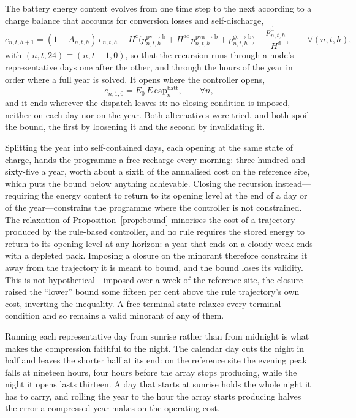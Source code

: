 \documentclass[11pt,a4paper]{article}
\theoremstyle{plain}
\theoremstyle{definition}
\begin{document}
The battery energy content evolves from one time step to the next according to a charge
balance that accounts for conversion losses and self-discharge,
\begin{equation}
  e_{n,t,h+1} = (1-A_{n,t,h})\,e_{n,t,h}
  + H^{\mathrm{c}}\big(p^{\mathrm{pv}\to\mathrm{b}}_{n,t,h}
  + H^{\mathrm{ac}}\,p^{\mathrm{pva}\to\mathrm{b}}_{n,t,h}
  + p^{\mathrm{ge}\to\mathrm{b}}_{n,t,h}\big)
  - \frac{p^{\mathrm{d}}_{n,t,h}}{H^{\mathrm{d}}},
  \qquad \forall (n,t,h),
  \label{eq:soc-dynamics}
\end{equation}
with $(n,t,24)\equiv(n,t+1,0)$, so that the recursion runs through a node's
representative days one after the other, and through the hours of the year in order where
a full year is solved. It opens where the controller opens,
\begin{equation}
  e_{n,1,0} = E_0\,\overline{E}\,\mathrm{cap}^{\mathrm{batt}}_n,
  \qquad \forall n,
  \label{eq:soc-opening}
\end{equation}
and it ends wherever the dispatch leaves it: no closing condition is imposed, neither on
each day nor on the year. Both alternatives were tried, and both spoil the bound, the first
by loosening it and the second by invalidating it.

Splitting the year into self-contained days, each opening at the same state of charge,
hands the programme a free recharge every morning: three hundred and sixty-five a year,
worth about a sixth of the annualised cost on the reference site, which puts the bound
below anything achievable. Closing the recursion instead---requiring the energy content to
return to its opening level at the end of a day or of the year---constrains the programme
where the controller is not constrained. The relaxation of Proposition~\ref{prop:bound}
minorises the cost of a trajectory produced by the rule-based controller, and no rule
requires the stored energy to return to its opening level at any horizon: a year that ends
on a cloudy week ends with a depleted pack. Imposing a closure on the minorant therefore
constrains it away from the trajectory it is meant to bound, and the bound loses its
validity. This is not hypothetical---imposed over a week of the reference site, the closure
raised the ``lower'' bound some fifteen per cent above the rule trajectory's own cost,
inverting the inequality. A free terminal state relaxes every terminal condition and so
remains a valid minorant of any of them.

Running each representative day from sunrise rather than from midnight is what makes the
compression faithful to the night. The calendar day cuts the night in half and leaves the
shorter half at its end: on the reference site the evening peak falls at nineteen hours,
four hours before the array stops producing, while the night it opens lasts thirteen. A
day that starts at sunrise holds the whole night it has to carry, and rolling the year to
the hour the array starts producing halves the error a compressed year makes on the
operating cost.
\end{document}
